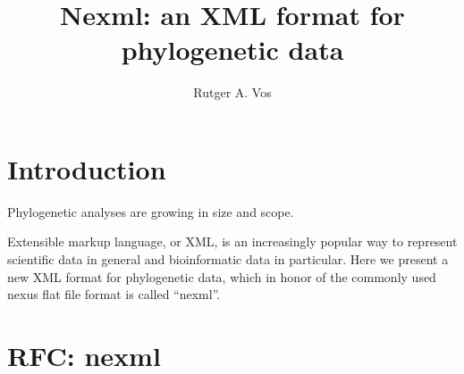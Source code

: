 \documentclass{article}
\author{Rutger A. Vos}
\title{Nexml: an XML format for phylogenetic data}
\begin{document}
\maketitle
\tableofcontents

\section{Introduction}
Phylogenetic analyses are growing in size and scope.

Extensible markup language, or XML\cite{citeulike:2580222}, is an increasingly popular way to represent 
scientific data in general \cite{citeulike:1937046} and bioinformatic data \cite{citeulike:242} in particular. 
Here we present a new XML format for phylogenetic data, which in honor of the commonly used nexus \cite{citeulike:2011773} 
flat file format is called ``nexml''.

\section{RFC: nexml}
% 
% 
\end{document}
